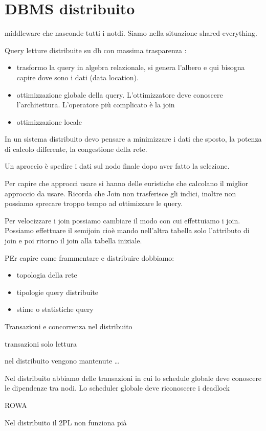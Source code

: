 \section{DBMS distribuito}
middleware che nasconde tutti i notdi. Siamo nella situazione shared-everything.

Query letture distribuite su db con massima trasparenza :
\begin{itemize}
    \item trasformo la query in algebra relazionale, si genera l'albero e qui
          bisogna capire dove sono i dati (data location).
    \item ottimizzazione globale della query. L'ottimizzatore deve conoscere l'architettura.
          L'operatore più complicato è la join
    \item ottimizzazione locale
\end{itemize}
In un sistema distribuito devo pensare a minimizzare i dati che sposto, la potenza
di calcolo differente, la congestione della rete.
\begin{esempio}
    Un aproccio è spedire i dati sul nodo finale dopo aver fatto la selezione.
\end{esempio}
Per capire che approcci usare si hanno delle euristiche che calcolano il miglior
approccio da usare. Ricorda che Join non trasferisce gli indici, inoltre non possiamo
sprecare troppo tempo ad ottimizzare le query.

Per velocizzare i join possiamo cambiare il modo con cui effettuiamo i join. Possiamo
effettuare il semijoin cioè mando nell'altra tabella solo l'attributo di join e poi
ritorno il join alla tabella iniziale.

PEr capire come frammentare e distribuire dobbiamo:
\begin{itemize}
    \item topologia della rete
    \item tipologie query distribuite
    \item stime o statistiche query
\end{itemize}

Transazioni e concorrenza nel distribuito

transazioni solo lettura

nel distribuito vengono mantenute \dots

Nel distribuito abbiamo delle transazioni in cui lo schedule globale deve conoscere 
le dipendenze tra nodi. Lo scheduler globale deve riconoscere i deadlock 

ROWA

Nel distribuito il 2PL  non funziona pià